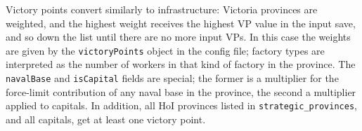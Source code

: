 \documentclass[12pt,ebook,oneside]{book}
\begin{document}
Victory points convert similarly to infrastructure: Victoria provinces
are weighted, and the highest weight receives the highest VP value in
the input save, and so down the list until there are no more input
VPs. In this case the weights are given by the \texttt{victoryPoints}
object in the config file; factory types are interpreted as the number
of workers in that kind of factory in the province. The
\texttt{navalBase} and \texttt{isCapital} fields are special; the
former is a multiplier for the force-limit contribution of any naval
base in the province, the second a multiplier applied to capitals. In addition,
all HoI provinces listed in \texttt{strategic\_provinces}, and all
capitals, get at least one victory point. 
\end{document}
